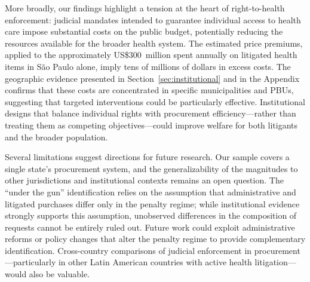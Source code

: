 More broadly, our findings highlight a tension at the heart of right-to-health enforcement: judicial mandates intended to guarantee individual access to health care impose substantial costs on the public budget, potentially reducing the resources available for the broader health system. The estimated price premiums, applied to the approximately US\$300~million spent annually on litigated health items in S\~ao Paulo alone, imply tens of millions of dollars in excess costs. The geographic evidence presented in Section~\ref{sec:institutional} and in the Appendix confirms that these costs are concentrated in specific municipalities and PBUs, suggesting that targeted interventions could be particularly effective. Institutional designs that balance individual rights with procurement efficiency---rather than treating them as competing objectives---could improve welfare for both litigants and the broader population.

Several limitations suggest directions for future research. Our sample covers a single state's procurement system, and the generalizability of the magnitudes to other jurisdictions and institutional contexts remains an open question. The ``under the gun'' identification relies on the assumption that administrative and litigated purchases differ only in the penalty regime; while institutional evidence strongly supports this assumption, unobserved differences in the composition of requests cannot be entirely ruled out. Future work could exploit administrative reforms or policy changes that alter the penalty regime to provide complementary identification. Cross-country comparisons of judicial enforcement in procurement---particularly in other Latin American countries with active health litigation---would also be valuable.
